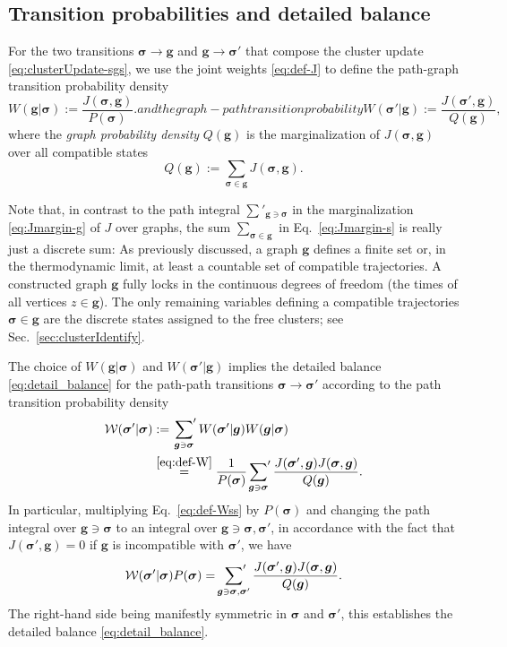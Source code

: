 \documentclass[english,10pt,aps,pra,twocolumn,superscriptaddress,floatfix,fleqn]{revtex4-2}
\newcommand{\mc}[1]{\mathcal{#1}}
\renewcommand{\vec}[1]{{\boldsymbol{#1}}}
\newcommand{\W} {\mc{W}}
\newcommand{\vg}{\vec{g}}
\newcommand{\vs}{\vec{\sigma}}
\newcommand{\sump}{\sideset{}{'}\sum}
\begin{document}
\subsection{Transition probabilities and detailed balance}
For the two transitions $\vs\to\vg$ and $\vg\to\vs'$ that compose the cluster update \eqref{eq:clusterUpdate-sgs}, we use the joint weights \eqref{eq:def-J} to define the path-graph transition probability density 
\begin{subequations}\label{eq:def-W}
\begin{equation}\label{eq:def-Wgs}
	W(\vg|\vs) := \frac{J(\vs,\vg)}{P(\vs)}.
\end{equation}
and the graph-path transition probability
\begin{equation}\label{eq:def-Wsg}
	W(\vs'|\vg) := \frac{J(\vs',\vg)}{Q(\vg)},
\end{equation}
\end{subequations}
where the \emph{graph probability density} $Q(\vg)$ is the marginalization of $J(\vs,\vg)$ over all compatible states
\begin{equation}\label{eq:Jmargin-s}
	Q(\vg):=\sum_{\vs\in\vg}J(\vs,\vg).
\end{equation}

Note that, in contrast to the path integral $\sum'_{\vg\ni\vs}$ in the marginalization \eqref{eq:Jmargin-g} of $J$ over graphs, the sum $\sum_{\vs\in\vg}$ in Eq.~\eqref{eq:Jmargin-s} is really just a discrete sum: As previously discussed, a graph $\vg$ defines a finite set or, in the thermodynamic limit, at least a countable set of compatible trajectories. A constructed graph $\vg$ fully locks in the continuous degrees of freedom (the times of all vertices $z \in \vg$). The only remaining variables defining a compatible trajectories $\vs\in\vg$ are the discrete states assigned to the free clusters; see Sec.~\ref{sec:clusterIdentify}.

The choice of $W(\vg|\vs)$ and $W(\vs'|\vg)$ implies the detailed balance \eqref{eq:detail_balance} for the path-path transitions $\vs\to\vs'$ according to the path transition probability density
\begin{align}\nonumber
	\W(\vs'|\vs)&:=\sump_{\vg\ni\vs}W(\vs'|\vg)W(\vg|\vs)\\
	&\stackrel{\eqref{eq:def-W}}{=} \frac{1}{P(\vs)}\sump_{\vg\ni\vs}\frac{J(\vs',\vg)J(\vs,\vg)}{Q(\vg)}.
	\label{eq:def-Wss}
\end{align}
In particular, multiplying Eq.~\eqref{eq:def-Wss} by $P(\vs)$ and changing the path integral over $\vg\ni\vs$ to an integral over $\vg\ni\vs,\vs'$, in accordance with the fact that $J(\vs',\vg)=0$ if $\vg$ is incompatible with $\vs'$, we have
\begin{align}\nonumber
	\W(\vs'|\vs)P(\vs)=\sump_{\vg\ni\vs,\vs'}\frac{J(\vs',\vg)J(\vs,\vg)}{Q(\vg)}.
\end{align}
The right-hand side being manifestly symmetric in $\vs$ and $\vs'$, this establishes the detailed balance \eqref{eq:detail_balance}.
\end{document}
